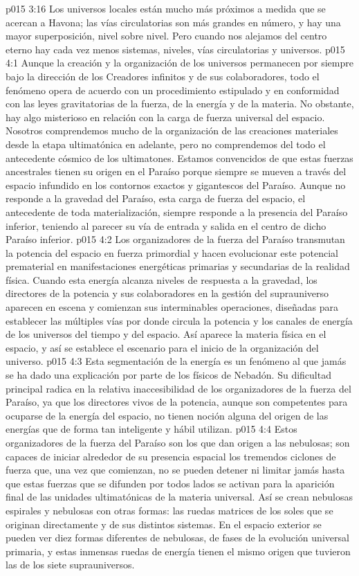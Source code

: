 \vs p015 3:16 \pc Los universos locales están mucho más próximos a medida que se acercan a Havona; las vías circulatorias son más grandes en número, y hay una mayor superposición, nivel sobre nivel. Pero cuando nos alejamos del centro eterno hay cada vez menos sistemas, niveles, vías circulatorias y universos.
\vs p015 4:1 Aunque la creación y la organización de los universos permanecen por siempre bajo la dirección de los Creadores infinitos y de sus colaboradores, todo el fenómeno opera de acuerdo con un procedimiento estipulado y en conformidad con las leyes gravitatorias de la fuerza, de la energía y de la materia. No obstante, hay algo misterioso en relación con la carga de fuerza universal del espacio. Nosotros comprendemos mucho de la organización de las creaciones materiales desde la etapa ultimatónica en adelante, pero no comprendemos del todo el antecedente cósmico de los ultimatones. Estamos convencidos de que estas fuerzas ancestrales tienen su origen en el Paraíso porque siempre se mueven a través del espacio infundido en los contornos exactos y gigantescos del Paraíso. Aunque no responde a la gravedad del Paraíso, esta carga de fuerza del espacio, el antecedente de toda materialización, siempre responde a la presencia del Paraíso inferior, teniendo al parecer su vía de entrada y salida en el centro de dicho Paraíso inferior.
\vs p015 4:2 Los organizadores de la fuerza del Paraíso transmutan la potencia del espacio en fuerza primordial y hacen evolucionar este potencial prematerial en manifestaciones energéticas primarias y secundarias de la realidad física. Cuando esta energía alcanza niveles de respuesta a la gravedad, los directores de la potencia y sus colaboradores en la gestión del suprauniverso aparecen en escena y comienzan sus interminables operaciones, diseñadas para establecer las múltiples vías por donde circula la potencia y los canales de energía de los universos del tiempo y del espacio. Así aparece la materia física en el espacio, y así se establece el escenario para el inicio de la organización del universo.
\vs p015 4:3 Esta segmentación de la energía es un fenómeno al que jamás se ha dado una explicación por parte de los físicos de Nebadón. Su dificultad principal radica en la relativa inaccesibilidad de los organizadores de la fuerza del Paraíso, ya que los directores vivos de la potencia, aunque son competentes para ocuparse de la energía del espacio, no tienen noción alguna del origen de las energías que de forma tan inteligente y hábil utilizan.
\vs p015 4:4 \pc Estos organizadores de la fuerza del Paraíso son los que dan origen a las nebulosas; son capaces de iniciar alrededor de su presencia espacial los tremendos ciclones de fuerza que, una vez que comienzan, no se pueden detener ni limitar jamás hasta que estas fuerzas que se difunden por todos lados se activan para la aparición final de las unidades ultimatónicas de la materia universal. Así se crean nebulosas espirales y nebulosas con otras formas: las ruedas matrices de los soles que se originan directamente y de sus distintos sistemas. En el espacio exterior se pueden ver diez formas diferentes de nebulosas, de fases de la evolución universal primaria, y estas inmensas ruedas de energía tienen el mismo origen que tuvieron las de los siete suprauniversos.
